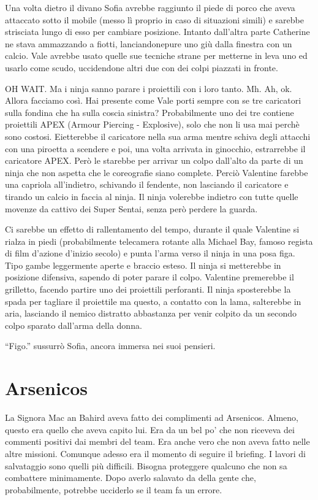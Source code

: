     Una volta dietro il divano Sofia avrebbe raggiunto il piede di porco che aveva attaccato sotto il mobile (messo lì
    proprio in caso di situazioni simili) e sarebbe strisciata lungo di esso per cambiare posizione. Intanto dall'altra
    parte Catherine ne stava ammazzando a fiotti, lanciandonepure uno giù dalla finestra con un calcio. Vale avrebbe
    usato quelle sue tecniche strane per metterne in leva uno ed usarlo come scudo, uccidendone altri due con dei colpi
    piazzati in fronte.

    OH WAIT. Ma i ninja sanno parare i proiettili con i loro tanto. Mh. Ah, ok. Allora facciamo così. Hai presente come
    Vale porti sempre con se tre caricatori sulla fondina che ha sulla coscia sinistra? Probabilmente uno dei tre
    contiene proiettili APEX (Armour Piercing - Explosive), solo che non li usa mai perchè sono costosi. Eietterebbe il caricatore nella sua arma
    mentre schiva degli attacchi con una piroetta a scendere e poi, una volta arrivata in ginocchio, estrarrebbe il
    caricatore APEX. Però le starebbe per arrivar un colpo dall'alto da parte di un ninja che non aspetta che le
    coreografie siano complete. Perciò Valentine farebbe una capriola all'indietro, schivando il fendente, non lasciando il caricatore e
    tirando un calcio in faccia al ninja. Il ninja volerebbe indietro con tutte quelle movenze da cattivo dei Super
    Sentai, senza però perdere la guarda.

    Ci sarebbe un effetto di rallentamento del tempo, durante il quale Valentine si rialza in piedi (probabilmente
    telecamera rotante alla Michael Bay, famoso regista di film d'azione d'inizio secolo) e punta l'arma verso il ninja
    in una posa figa. Tipo gambe leggermente aperte e braccio esteso. Il ninja si metterebbe in posizione difensiva,
    sapendo di poter parare il colpo. Valentine premerebbe il grilletto, facendo partire uno dei proiettili perforanti.
    Il ninja sposterebbe la spada per tagliare il proiettile ma questo, a contatto con la lama, salterebbe in aria,
    lasciando il nemico distratto abbastanza per venir colpito da un secondo colpo sparato dall'arma della donna.

    ``Figo.'' sussurrò Sofia, ancora immersa nei suoi pensieri.

  \section*{Arsenicos}

    La Signora Mac an Bahird aveva fatto dei complimenti ad Arsenicos. Almeno, questo era quello che aveva capito lui.
    Era da un bel po' che non riceveva dei commenti positivi dai membri del team. Era anche vero che non aveva fatto
    nelle altre missioni. Comunque adesso era il momento di seguire il briefing. I lavori di salvataggio sono quelli più
    difficili. Bisogna proteggere qualcuno che non sa combattere minimamente. Dopo averlo salavato da della gente che,
    probabilmente, potrebbe ucciderlo se il team fa un errore.
    
